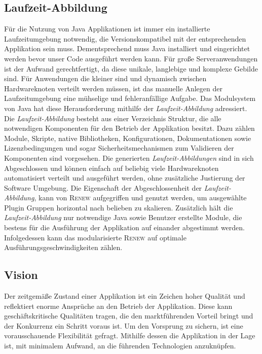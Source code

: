 	\subsection{Laufzeit-Abbildung} \label{sub:laufzeit_images}
		Für die Nutzung von Java Applikationen ist immer ein installierte Laufzeitumgebung notwendig, die Versionskompatibel mit der entsprechenden Applikation sein muss. Dementsprechend muss Java installiert und eingerichtet werden bevor unser Code ausgeführt werden kann. Für große Serveranwendungen ist der Aufwand gerechtfertigt, da diese unikale, langlebige und komplexe Gebilde sind. Für Anwendungen die kleiner sind und dynamisch zwischen Hardwareknoten verteilt werden müssen, ist das manuelle Anlegen der Laufzeitumgebung eine mühselige und fehleranfällige Aufgabe. \newline
		Das Modulsystem von Java hat diese Herausforderung mithilfe der \textit{Laufzeit-Abbildung} adressiert. Die \textit{Laufzeit-Abbildung} besteht aus einer Verzeichnis Struktur, die alle notwendigen Komponenten für den Betrieb der Applikation besitzt. Dazu zählen Module, Skripte, native Bibliotheken, Konfigurationen, Dokumentationen sowie Lizenzbedingungen und sogar Sicherheitsmechanismen zum Validieren der Komponenten sind vorgesehen. Die generierten \textit{Laufzeit-Abbildungen} sind in sich Abgeschlossen und können einfach auf beliebig viele Hardwareknoten automatisiert verteilt und ausgeführt werden, ohne zusätzliche Justierung der Software Umgebung. \bigbreak
		Die Eigenschaft der Abgeschlossenheit der \textit{Laufzeit-Abbildung}, kann von \textsc{Renew} aufgegriffen und genutzt werden, um ausgewählte Plugin Gruppen horizontal nach belieben zu skalieren. Zusätzlich hält die \textit{Laufzeit-Abbildung} nur notwendige Java sowie Benutzer erstellte Module, die bestens für die Ausführung der Applikation auf einander abgestimmt werden. Infolgedessen kann das modularisierte \textsc{Renew} auf optimale Ausführungsgeschwindigkeiten zählen. 

	\subsection{Vision} \label{sub:moderner_zustand}
		Der zeitgemäße Zustand einer Applikation ist ein Zeichen hoher Qualität und reflektiert enorme Ansprüche an den Betrieb der Applikation. Diese kann geschäftskritische Qualitäten tragen, die den marktführenden Vorteil bringt und der Konkurrenz ein Schritt voraus ist. Um den Vorsprung zu sichern, ist eine vorausschauende Flexibilität gefragt. Mithilfe dessen die Applikation in der Lage ist, mit minimalem Aufwand, an die führenden Technologien anzuknüpfen. 

